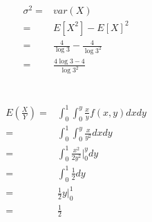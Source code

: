 \documentclass{article}
\begin{document}
            \begin{equation*}
                \begin{split}
                    \sigma^2=&var(X)\\
                        =&E[X^2]-E[X]^2\\
                        =&\frac{4}{\log 3}-\frac{4}{\log 3 ^2}\\
                        =&\frac{4\log 3 -4}{\log 3 ^2}
                \end{split}
            \end{equation*}

    \section{}
        \begin{equation*}
            \begin{split}
                E(\frac{X}{Y})=&\int _0 ^1 \int _0 ^y \frac{x}{y}f(x,y) dx dy\\
                    =&\int _0 ^1 \int _0 ^y \frac{x}{y^2} dx dy\\
                    =&\int _0 ^1 \frac{x^2}{2y^2}|_0 ^y dy \\
                    =&\int _0 ^1 \frac{1}{2} dy\\
                    =& \frac{1}{2} y | _0 ^1 \\
                    =& \frac{1}{2} 
            \end{split}
        \end{equation*}
            
    \section{}
\end{document}
